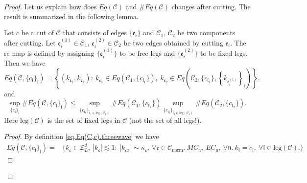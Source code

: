 \begin{proof}
Let us explain how does $Eq(\mathcal{C})$ and $\#Eq(\mathcal{C})$ changes after cutting. The result is summarized in the following lemma.
\begin{lem}\label{lem.Eq(C)cutting}
Let $c$ be a cut of $\mathcal{C}$ that consists of edges $\{\mathfrak{e}_{i}\}$ and $\mathcal{C}_1$, $\mathcal{C}_2$ be two components after cutting. Let $\mathfrak{e}_{i}^{(1)}\in \mathcal{C}_1$, $\mathfrak{e}_{i}^{(2)}\in \mathcal{C}_2$ be two edges obtained by cutting $\mathfrak{e}_{i}$. The $\text{rc}$ map is defined by assigning $\{\mathfrak{e}_{i}^{(1)}\}$ to be free legs and $\{\mathfrak{e}_{i}^{(2)}\}$ to be fixed legs. Then we have 
\begin{equation}\label{eq.Eq(C)cutting.threewave}
    Eq(\mathcal{C},\{c_{\mathfrak{l}}\}_{\mathfrak{l}})=\left\{(k_{\mathfrak{e}_1},k_{\mathfrak{e}_{2}}):\ k_{\mathfrak{e}_1}\in Eq(\mathcal{C}_1,\{c_{\mathfrak{l}_1}\}),\  k_{\mathfrak{e}_{2}}\in Eq\left(\mathcal{C}_{2}, \{c_{\mathfrak{l}_2}\}, \left\{k_{\mathfrak{e}_{i}^{(1)}}\right\}_{i}\right)\right\}.
\end{equation}
and
\begin{equation}\label{eq.Eq(C)cuttingcounting.threewave}
    \sup_{\{c_{\mathfrak{l}}\}_{\mathfrak{l}}}\#Eq(\mathcal{C},\{c_{\mathfrak{l}}\}_{\mathfrak{l}})\le
    \sup_{\{c_{\mathfrak{l}_1}\}_{\mathfrak{l}_1\in \text{leg}(\mathcal{C}_1)} } \# Eq(\mathcal{C}_1,\{c_{\mathfrak{l}_1}\}) \sup_{\{c_{\mathfrak{l}_2}\}_{\mathfrak{l}_2\in \text{leg}(\mathcal{C}_2)} }\# Eq(\mathcal{C}_{2}, \{c_{\mathfrak{l}_2}\}).
\end{equation}
Here $\text{leg}(\mathcal{C})$ is the set of fixed legs in $\mathcal{C}$ (not the set of all legs!).
\end{lem}
\begin{proof}
By definition \eqref{eq.Eq(C,c).threewave} we have
\begin{equation}
\begin{split}
    Eq(\mathcal{C},\{c_{\mathfrak{l}}\}_{\mathfrak{l}})=&\{k_{\mathfrak{e}}\in \mathbb{Z}^d_L,\ |k_{\mathfrak{e}}|\lesssim 1:\  |k_{\mathfrak{e}x}| \sim \kappa_{\mathfrak{e}},\ \forall \mathfrak{e}\in \mathcal{C}_{\text{norm}}.\ MC_{\mathfrak{n}},\  EC_{\mathfrak{n}},\ \forall \mathfrak{n}.\  k_{\mathfrak{l}}=c_{\mathfrak{l}},\ \forall \mathfrak{l}\in \text{leg}(\mathcal{C}).\} 

\end{split}
\end{equation}
\end{proof}
\end{proof}
